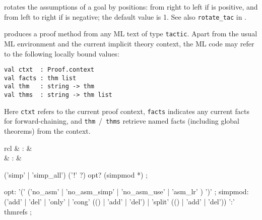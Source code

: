 \begin{isabellebody}
\begin{isamarkuptext}
\begin{descr}
  \item [\hyperlink{method.rotate-tac}{\mbox{\isa{rotate{\isacharunderscore}tac}}}~\isa{n}] rotates the assumptions of a
  goal by  positions: from right to left if  is
  positive, and from left to right if  is negative; the
  default value is 1.  See also \verb|rotate_tac| in
  \cite[\S3]{isabelle-ref}.

  \item [\hyperlink{method.tactic}{\mbox{\isa{tactic}}}~\isa{{\isachardoublequote}text{\isachardoublequote}}] produces a proof method from
  any ML text of type \verb|tactic|.  Apart from the usual ML
  environment and the current implicit theory context, the ML code may
  refer to the following locally bound values:

{\footnotesize\begin{verbatim}
val ctxt  : Proof.context
val facts : thm list
val thm   : string -> thm
val thms  : string -> thm list
\end{verbatim}}

  Here \verb|ctxt| refers to the current proof context, \verb|facts| indicates any current facts for forward-chaining, and \verb|thm|~/~\verb|thms| retrieve named facts (including global theorems)
  from the context.

  \end{descr}%
\end{isamarkuptext}%
\isamarkuptrue%
%
\isamarkuptrue%
%
\isamarkuptrue%
%
\begin{isamarkuptext}%
\begin{matharray}{rcl}
    \hypertarget{method.simp}{\hyperlink{method.simp}{\mbox{}}} & : & \isarmeth \\
    \hypertarget{method.simp-all}{\hyperlink{method.simp-all}{\mbox{}}} & : & \isarmeth \\
  \end{matharray}

  \begin{rail}
    ('simp' | 'simp\_all') ('!' ?) opt? (simpmod *)
    ;

    opt: '(' ('no\_asm' | 'no\_asm\_simp' | 'no\_asm\_use' | 'asm\_lr' ) ')'
    ;
    simpmod: ('add' | 'del' | 'only' | 'cong' (() | 'add' | 'del') |
      'split' (() | 'add' | 'del')) ':' thmrefs
    ;
  \end{rail}


\end{isamarkuptext}
\end{isabellebody}
